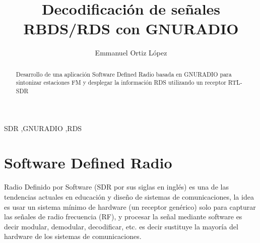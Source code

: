 \documentclass[preprint,12pt]{elsarticle}
\begin{document}
\begin{frontmatter}


\title{Decodificación de señales RBDS/RDS con GNURADIO}




\author{Emmanuel Ortiz López}


\begin{abstract}
Desarrollo de una aplicación Software Defined Radio basada en GNURADIO para sintonizar estaciones FM y desplegar la información RDS utilizando un receptor RTL-SDR
\end{abstract}

\begin{keyword}
SDR \sep GNURADIO \sep RDS


\end{keyword}

\end{frontmatter}


\section{Software Defined Radio}
\label{S:1}
Radio Definido por Software (SDR por sus siglas en inglés) es una de las tendencias actuales en educación y diseño de sistemas de comunicaciones, la idea es usar un sistema mínimo de hardware (un receptor genérico) solo para capturar las señales de radio frecuencia (RF), y procesar la señal mediante software es decir modular, demodular, decodificar, etc. es decir sustituye la mayoría del hardware de los sistemas de comunicaciones.
\end{document}
